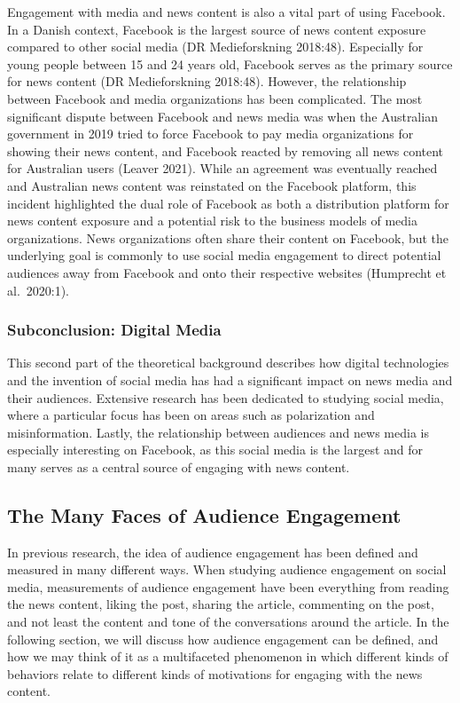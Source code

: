 \documentclass[
]{article}
\begin{document}
Engagement with media and news content is also a vital part of using
Facebook. In a Danish context, Facebook is the largest source of news
content exposure compared to other social media (DR Medieforskning
2018:48). Especially for young people between 15 and 24 years old,
Facebook serves as the primary source for news content (DR
Medieforskning 2018:48). However, the relationship between Facebook and
media organizations has been complicated. The most significant dispute
between Facebook and news media was when the Australian government in
2019 tried to force Facebook to pay media organizations for showing
their news content, and Facebook reacted by removing all news content
for Australian users (Leaver 2021). While an agreement was eventually
reached and Australian news content was reinstated on the Facebook
platform, this incident highlighted the dual role of Facebook as both a
distribution platform for news content exposure and a potential risk to
the business models of media organizations. News organizations often
share their content on Facebook, but the underlying goal is commonly to
use social media engagement to direct potential audiences away from
Facebook and onto their respective websites (Humprecht et al.~2020:1).

\hypertarget{subconclusion-digital-media}{%
\subsubsection{Subconclusion: Digital
Media}\label{subconclusion-digital-media}}

\noindent This second part of the theoretical background describes how
digital technologies and the invention of social media has had a
significant impact on news media and their audiences. Extensive research
has been dedicated to studying social media, where a particular focus
has been on areas such as polarization and misinformation. Lastly, the
relationship between audiences and news media is especially interesting
on Facebook, as this social media is the largest and for many serves as
a central source of engaging with news content.

\hypertarget{the-many-faces-of-audience-engagement}{%
\subsection{The Many Faces of Audience
Engagement}\label{the-many-faces-of-audience-engagement}}

In previous research, the idea of audience engagement has been defined
and measured in many different ways. When studying audience engagement
on social media, measurements of audience engagement have been
everything from reading the news content, liking the post, sharing the
article, commenting on the post, and not least the content and tone of
the conversations around the article. In the following section, we will
discuss how audience engagement can be defined, and how we may think of
it as a multifaceted phenomenon in which different kinds of behaviors
relate to different kinds of motivations for engaging with the news
content.
\end{document}
